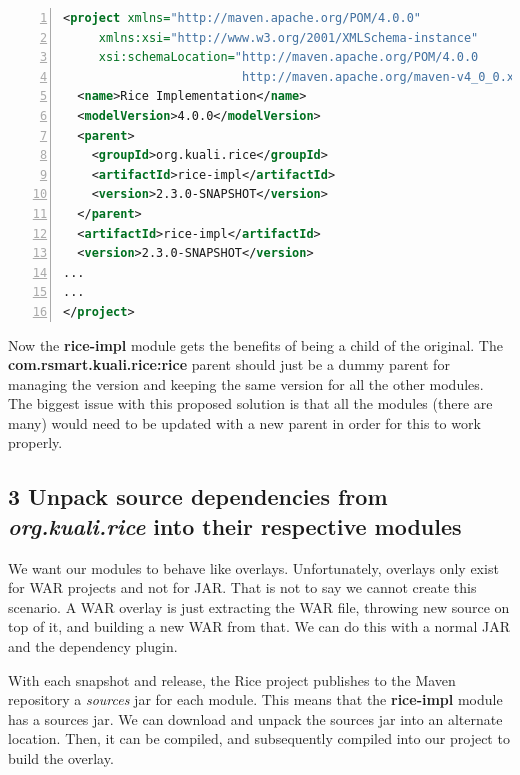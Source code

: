 \documentclass[12pt,notitlepage]{article}
\begin{document}
\newpage 
\begin{lstlisting}[numbers=left,language=xml,basicstyle=\scriptsize,backgroundcolor=\color{ubergray},caption={Custom Impl Module Alternative Parent Definition},frame=single,breaklines=true]
<project xmlns="http://maven.apache.org/POM/4.0.0" 
     xmlns:xsi="http://www.w3.org/2001/XMLSchema-instance" 
     xsi:schemaLocation="http://maven.apache.org/POM/4.0.0 
                         http://maven.apache.org/maven-v4_0_0.xsd">
  <name>Rice Implementation</name>
  <modelVersion>4.0.0</modelVersion>
  <parent>
    <groupId>org.kuali.rice</groupId>
    <artifactId>rice-impl</artifactId>
    <version>2.3.0-SNAPSHOT</version>
  </parent>
  <artifactId>rice-impl</artifactId>
  <version>2.3.0-SNAPSHOT</version>
...
...
</project>
  \end{lstlisting}

Now the \textbf{rice-impl} module gets the benefits of being a child of the original. The \textbf{com.rsmart.kuali.rice:rice} parent should just be a dummy parent for managing the version and keeping the same version for all the other modules. The biggest issue with this proposed solution is that all the modules (there are many) would need to be updated with a new parent in order for this to work properly.

\subsection*{3 Unpack source dependencies from \emph{org.kuali.rice} into their respective modules}
We want our modules to behave like overlays. Unfortunately, overlays only exist for WAR projects and not for JAR. That is not to say we cannot create this scenario. A WAR overlay is just extracting the WAR file, throwing new source on top of it, and building a new WAR from that. We can do this with a normal JAR and the dependency plugin. 

With each snapshot and release, the Rice project publishes to the Maven repository a \emph{sources} jar for each module. This means that the \textbf{rice-impl} module has a sources jar. We can download and unpack the sources jar into an alternate location. Then, it can be compiled, and subsequently compiled into our project to build the overlay.
\end{document}
